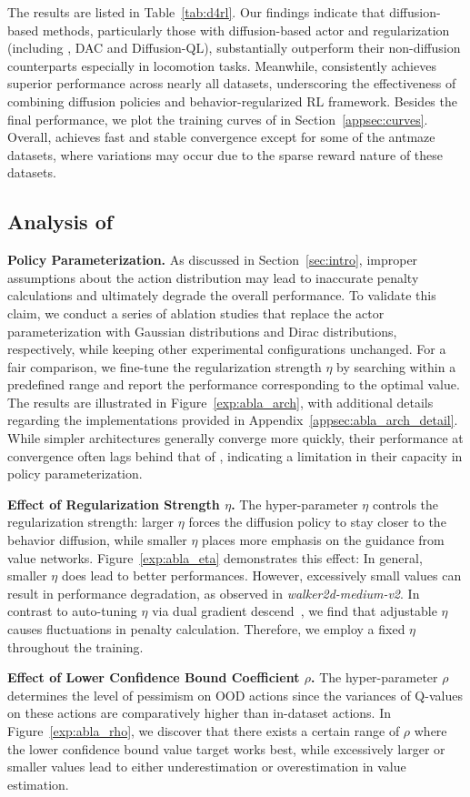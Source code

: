 The results are listed in Table~\ref{tab:d4rl}. Our findings indicate that diffusion-based methods, particularly those with diffusion-based actor and regularization (including \algbb, DAC and Diffusion-QL), substantially outperform their non-diffusion counterparts especially in locomotion tasks. Meanwhile, \algbb consistently achieves superior performance across nearly all datasets, underscoring the effectiveness of combining diffusion policies and behavior-regularized RL framework. Besides the final performance, we plot the training curves of \algbb in Section~\ref{appsec:curves}. Overall, \algbb achieves fast and stable convergence except for some of the antmaze datasets, where variations may occur due to the sparse reward nature of these datasets. 

\subsection{Analysis of \algbb}
\textbf{Policy Parameterization. }As discussed in Section~\ref{sec:intro}, improper assumptions about the action distribution may lead to inaccurate penalty calculations and ultimately degrade the overall performance. To validate this claim, we conduct a series of ablation studies that replace the actor parameterization with Gaussian distributions and Dirac distributions, respectively, while keeping other experimental configurations unchanged. For a fair comparison, we fine-tune the regularization strength $\eta$ by searching within a predefined range and report the performance corresponding to the optimal value. The results are illustrated in Figure~\ref{exp:abla_arch}, with additional details regarding the implementations provided in Appendix~\ref{appsec:abla_arch_detail}. While simpler architectures generally converge more quickly, their performance at convergence often lags behind that of \algbb, indicating a limitation in their capacity in policy parameterization. 

\textbf{Effect of Regularization Strength $\eta$. }The hyper-parameter $\eta$ controls the regularization strength: larger $\eta$ forces the diffusion policy to stay closer to the behavior diffusion, while smaller $\eta$ places more emphasis on the guidance from value networks. Figure~\ref{exp:abla_eta} demonstrates this effect: In general, smaller $\eta$ does lead to better performances. However, excessively small values can result in performance degradation, as observed in \textit{walker2d-medium-v2}. In contrast to auto-tuning $\eta$ via dual gradient descend~\citep{dac,dpqe}, we find that adjustable $\eta$ causes fluctuations in penalty calculation. Therefore, we employ a fixed $\eta$ throughout the training. 

\textbf{Effect of Lower Confidence Bound Coefficient $\rho$. }The hyper-parameter $\rho$ determines the level of pessimism on OOD actions since the variances of Q-values on these actions are comparatively higher than in-dataset actions. In Figure~\ref{exp:abla_rho}, we discover that there exists a certain range of $\rho$ where the lower confidence bound value target works best, while excessively larger or smaller values lead to either underestimation or overestimation in value estimation. 
